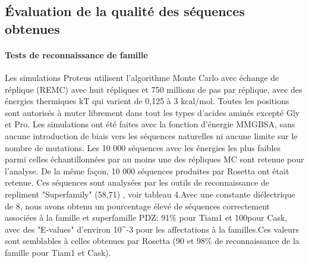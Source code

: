 \begin{enumarete}
\subsection{Évaluation de la qualité des séquences obtenues}

\paragraph{Tests de reconnaissance de famille}

Les simulations Proteus utilisent l'algorithme Monte Carlo avec échange de réplique (REMC) avec huit répliques et 750 millions de pas par réplique, avec des énergies thermiques kT  qui varient de 0,125 à 3 kcal/mol. Toutes les positions sont autorisés à muter librement dans tout les types d'acides aminés excepté Gly et Pro. Les simulations ont été faites avec la fonction d'énergie MMGBSA, sans aucune introduction de biais vers  les séquences naturelles ni aucune limite sur le nombre de mutations. Les 10 000 séquences avec les énergies les plus faibles parmi celles échantillonnées par au moins une des répliques MC sont retenue pour l'analyse. De la même façon, 10 000 séquences produites par Rosetta ont était retenue. Ces séquences sont analysées par les outils de reconnaissance de repliment "Superfamily" (58,71) , voir tableau 4.Avec une constante diélectrique de 8, nous avons obtenu un pourcentage élevé de séquences correctement associées à la famille et superfamille PDZ: 91\% pour Tiam1 et 100\ù pour Cask, avec des "E-values" d'environ 10^{-3} pour les affectations à la familles.Ces valeurs sont semblables à celles obtenues par Rosetta (90 et 98\% de reconnaissance de la famille pour Tiam1  et Cask).


\end{enumarete}
